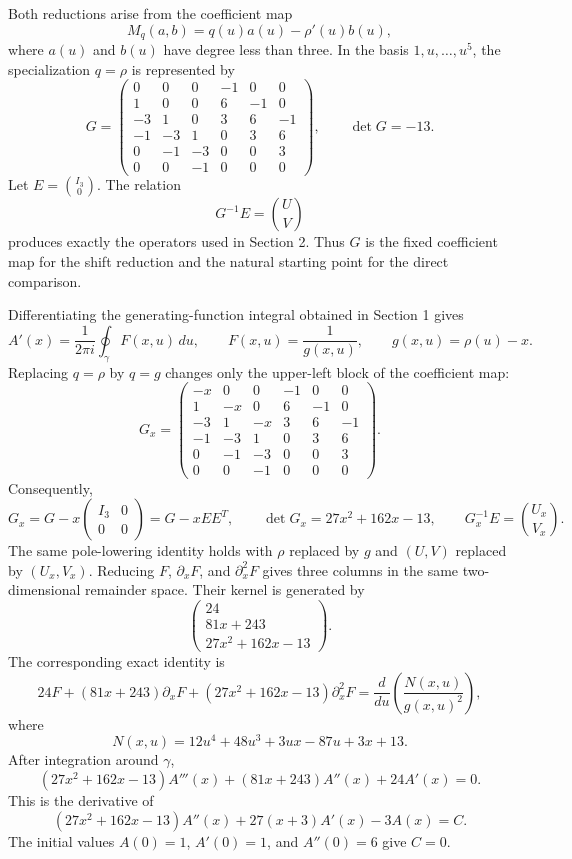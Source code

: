 \documentclass[11pt,fleqn]{article}
\theoremstyle{plain}
\newcommand{\dd}{\,d}
\begin{document}
Both reductions arise from the coefficient map
\[
M_q(a,b)=q(u)a(u)-\rho'(u)b(u),
\]
where $a(u)$ and $b(u)$ have degree less than three.  In the basis
$1,u,\ldots,u^5$, the specialization $q=\rho$ is represented by
\[
G=
\begin{pmatrix}
0&0&0&-1&0&0\\
1&0&0&6&-1&0\\
-3&1&0&3&6&-1\\
-1&-3&1&0&3&6\\
0&-1&-3&0&0&3\\
0&0&-1&0&0&0
\end{pmatrix},
\qquad \det G=-13.
\]
Let $E=\binom{I_3}{0}$.  The relation
\[
G^{-1}E=\binom{U}{V}
\]
produces exactly the operators used in Section 2.  Thus $G$ is the fixed
coefficient map for the shift reduction and the natural starting point for the
direct comparison.

Differentiating the generating-function integral obtained in Section 1 gives
\[
A'(x)=\frac{1}{2\pi i}\oint_\gamma F(x,u)\dd u,
\qquad
F(x,u)=\frac1{g(x,u)},
\qquad
g(x,u)=\rho(u)-x.
\]
Replacing $q=\rho$ by $q=g$ changes only the upper-left block of the
coefficient map:
\[
G_x=
\begin{pmatrix}
-x&0&0&-1&0&0\\
1&-x&0&6&-1&0\\
-3&1&-x&3&6&-1\\
-1&-3&1&0&3&6\\
0&-1&-3&0&0&3\\
0&0&-1&0&0&0
\end{pmatrix}.
\]
Consequently,
\[
G_x=G-x\begin{pmatrix}I_3&0\\0&0\end{pmatrix}
    =G-xEE^T,
\qquad
\det G_x=27x^2+162x-13,
\qquad
G_x^{-1}E=\binom{U_x}{V_x}.
\]
The same pole-lowering identity holds with $\rho$ replaced by $g$ and
$(U,V)$ replaced by $(U_x,V_x)$.  Reducing $F$, $\partial_xF$, and
$\partial_x^2F$ gives three columns in the same two-dimensional remainder
space.  Their kernel is generated by
\[
\begin{pmatrix}
24\\81x+243\\27x^2+162x-13
\end{pmatrix}.
\]
The corresponding exact identity is
\[
24F+(81x+243)\partial_xF+(27x^2+162x-13)\partial_x^2F
=
\frac{d}{du}\left(\frac{N(x,u)}{g(x,u)^2}\right),
\]
where
\[
N(x,u)=12u^4+48u^3+3ux-87u+3x+13.
\]
After integration around $\gamma$,
\[
(27x^2+162x-13)A'''(x)+(81x+243)A''(x)+24A'(x)=0.
\]
This is the derivative of
\[
(27x^2+162x-13)A''(x)+27(x+3)A'(x)-3A(x)=C.
\]
The initial values $A(0)=1$, $A'(0)=1$, and $A''(0)=6$ give $C=0$.
\end{document}
